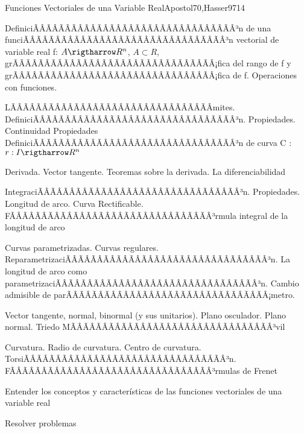 \begin{sumilla}
\begin{unit}{Funciones Vectoriales de una Variable Real}{Apostol70,Hasser97}{14}
   \begin{topicos}
	\item  DefiniciÃÂÃÂÃÂÃÂÃÂÃÂÃÂÃÂÃÂÃÂÃÂÃÂÃÂÃÂÃÂÃÂ³n de una funciÃÂÃÂÃÂÃÂÃÂÃÂÃÂÃÂÃÂÃÂÃÂÃÂÃÂÃÂÃÂÃÂ³n vectorial de variable real f: $A \rigtharrow R^n$, $A \subset R$, grÃÂÃÂÃÂÃÂÃÂÃÂÃÂÃÂÃÂÃÂÃÂÃÂÃÂÃÂÃÂÃÂ¡fica del rango de f y grÃÂÃÂÃÂÃÂÃÂÃÂÃÂÃÂÃÂÃÂÃÂÃÂÃÂÃÂÃÂÃÂ¡fica de f. Operaciones con funciones.
	\item LÃÂÃÂÃÂÃÂÃÂÃÂÃÂÃÂÃÂÃÂÃÂÃÂÃÂÃÂÃÂÃÂ­mites. DefiniciÃÂÃÂÃÂÃÂÃÂÃÂÃÂÃÂÃÂÃÂÃÂÃÂÃÂÃÂÃÂÃÂ³n. Propiedades. Continuidad  Propiedades DefiniciÃÂÃÂÃÂÃÂÃÂÃÂÃÂÃÂÃÂÃÂÃÂÃÂÃÂÃÂÃÂÃÂ³n de curva C : $r : I \rigtharrow R^n$
	\item  Derivada. Vector tangente. Teoremas sobre la derivada. La diferenciabilidad
	\item  IntegraciÃÂÃÂÃÂÃÂÃÂÃÂÃÂÃÂÃÂÃÂÃÂÃÂÃÂÃÂÃÂÃÂ³n. Propiedades. Longitud de arco. Curva Rectificable. FÃÂÃÂÃÂÃÂÃÂÃÂÃÂÃÂÃÂÃÂÃÂÃÂÃÂÃÂÃÂÃÂ³rmula integral de la longitud de arco
	\item  Curvas parametrizadas. Curvas regulares. ReparametrizaciÃÂÃÂÃÂÃÂÃÂÃÂÃÂÃÂÃÂÃÂÃÂÃÂÃÂÃÂÃÂÃÂ³n. La longitud de arco como parametrizaciÃÂÃÂÃÂÃÂÃÂÃÂÃÂÃÂÃÂÃÂÃÂÃÂÃÂÃÂÃÂÃÂ³n. Cambio admisible de parÃÂÃÂÃÂÃÂÃÂÃÂÃÂÃÂÃÂÃÂÃÂÃÂÃÂÃÂÃÂÃÂ¡metro.
	\item  Vector tangente, normal, binormal (y sus unitarios). Plano osculador. Plano normal. Triedo MÃÂÃÂÃÂÃÂÃÂÃÂÃÂÃÂÃÂÃÂÃÂÃÂÃÂÃÂÃÂÃÂ³vil
	\item Curvatura. Radio de curvatura.  Centro de curvatura. TorsiÃÂÃÂÃÂÃÂÃÂÃÂÃÂÃÂÃÂÃÂÃÂÃÂÃÂÃÂÃÂÃÂ³n. FÃÂÃÂÃÂÃÂÃÂÃÂÃÂÃÂÃÂÃÂÃÂÃÂÃÂÃÂÃÂÃÂ³rmulas de Frenet
   \end{topicos}

   \begin{objetivos}
         \item  Entender los conceptos y caracter\'isticas de las funciones vectoriales de una variable real
         \item  Resolver problemas
   \end{objetivos}
\end{unit}


\end{sumilla}
